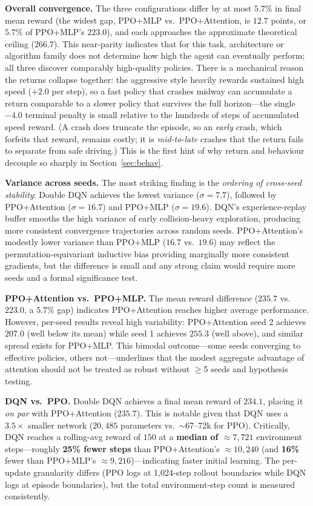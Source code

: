 \documentclass[conference]{IEEEtran}
\begin{document}
\textbf{Overall convergence.} The three configurations differ by at most
$5.7\%$ in final mean reward (the widest gap, PPO+MLP vs.\ PPO+Attention, is
$12.7$ points, or $5.7\%$ of PPO+MLP's $223.0$), and each
approaches the approximate theoretical ceiling ($266.7$). This near-parity
indicates that for this task, architecture or algorithm family does not
determine how high the agent can eventually perform; all three discover
comparably high-quality policies. There is a mechanical reason the returns
collapse together: the aggressive style heavily rewards sustained high speed
($+2.0$ per step), so a fast policy that crashes midway can accumulate a return
comparable to a slower policy that survives the full horizon---the single
$-4.0$ terminal penalty is small relative to the hundreds of steps of
accumulated speed reward. (A crash does truncate the episode, so an \emph{early}
crash, which forfeits that reward, remains costly; it is \emph{mid-to-late}
crashes that the return fails to separate from safe driving.) This is the first
hint of why return and behaviour decouple so sharply in Section~\ref{sec:behav}.

\textbf{Variance across seeds.} The most striking finding is the
\emph{ordering of cross-seed stability}: Double DQN achieves the lowest
variance ($\sigma=7.7$), followed by PPO+Attention ($\sigma=16.7$) and
PPO+MLP ($\sigma=19.6$). DQN's experience-replay buffer smooths the high
variance of early collision-heavy exploration, producing more consistent
convergence trajectories across random seeds. PPO+Attention's modestly lower
variance than PPO+MLP ($16.7$ vs.\ $19.6$) may reflect the permutation-equivariant
inductive bias providing marginally more consistent gradients, but the
difference is small and any strong claim would require more seeds and a
formal significance test.

\textbf{PPO+Attention vs.\ PPO+MLP.} The mean reward difference ($235.7$
vs.\ $223.0$, a $5.7\%$ gap) indicates PPO+Attention reaches higher average
performance. However, per-seed results reveal high variability: PPO+Attention
seed 2 achieves $207.0$ (well below its mean) while seed 1 achieves $255.3$
(well above), and similar spread exists for PPO+MLP. This bimodal outcome---some
seeds converging to effective policies, others not---underlines that the modest
aggregate advantage of attention should not be treated as robust without
$\geq$5 seeds and hypothesis testing.

\textbf{DQN vs.\ PPO.} Double DQN achieves a final mean reward of $234.1$,
placing it \emph{on par} with PPO+Attention ($235.7$). This is notable given
that DQN uses a $3.5\times$ smaller network ($20{,}485$ parameters vs.\
${\sim}67$--$72$k for PPO). Critically, DQN reaches a rolling-avg reward of
$150$ at a \textbf{median of ${\approx}7{,}721$} environment steps---roughly
\textbf{25\% fewer steps} than PPO+Attention's ${\approx}10{,}240$ (and
\textbf{16\%} fewer than PPO+MLP's ${\approx}9{,}216$)---indicating
faster initial learning. The per-update granularity differs (PPO logs at
1,024-step rollout boundaries while DQN logs at episode boundaries), but the
total environment-step count is measured consistently.
\end{document}
